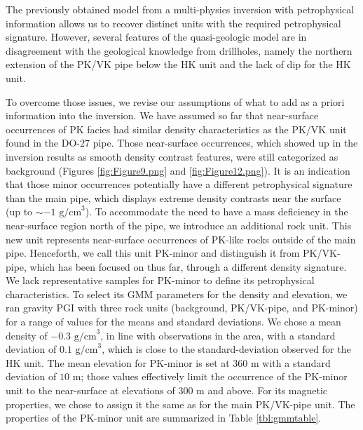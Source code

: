 \documentclass[paper, twocolumn]{geophysics} %
\begin{document}
The previously obtained model from a multi-physics inversion with petrophysical information allows us to recover distinct units with the required petrophysical signature. However, several features of the quasi-geologic model are in disagreement with the geological knowledge from drillholes, namely the northern extension of the PK/VK pipe below the HK unit and the lack of dip for the HK unit.

To overcome those issues, we revise our assumptions of what to add as a priori information into the inversion. We have assumed so far that near-surface occurrences of PK facies had similar density characteristics as the PK/VK unit found in the DO-$27$ pipe. Those near-surface occurrences, which showed up in the inversion results as smooth density contrast features, were still categorized as background (Figures \ref{fig:Figure9.png} and \ref{fig:Figure12.png}). It is an indication that those minor occurrences potentially have a different petrophysical signature than the main pipe, which displays extreme density contrasts near the surface (up to $\sim-1 \text{ g/cm}^3$). To accommodate the need to have a mass deficiency in the near-surface region north of the pipe, we introduce an additional rock unit. This new unit represents near-surface occurrences of PK-like rocks outside of the main pipe. Henceforth, we call this unit PK-minor and distinguish it from PK/VK-pipe, which has been focused on thus far, through a different density signature. We lack representative samples for PK-minor to define its petrophysical characteristics. To select its GMM parameters for the density and elevation, we ran gravity PGI with three rock units (background, PK/VK-pipe, and PK-minor) for a range of values for the means and standard deviations. We chose a mean density of $-0.3 \text{ g/cm}^3$, in line with observations in the area, with a standard deviation of $0.1 \text{ g/cm}^3$, which is close to the standard-deviation observed for the HK unit. The mean elevation for PK-minor is set at $360$ m with a standard deviation of $10$ m; those values effectively limit the occurrence of the PK-minor unit to the near-surface at elevations of $300$ m and above. For its magnetic properties, we chose to assign it the same as for the main PK/VK-pipe unit. The properties of the PK-minor unit are summarized in Table \ref{tbl:gmmtable}.
\end{document}
